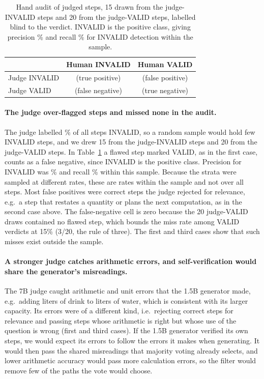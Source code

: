 \documentclass{article}
\begin{document}
\begin{table}[t]
  \centering
  \small
  \caption{Hand audit of \auditN{} judged steps, 15 drawn from the judge-INVALID steps and 20 from the judge-VALID steps, labelled blind to the verdict. INVALID is the positive class, giving precision \auditPrecision\% and recall \auditRecall\% for INVALID detection within the sample.}
  \label{tab:audit}
  \begin{tabular}{lcc}
    \toprule
     & Human INVALID & Human VALID \\
    \midrule
    Judge INVALID & \auditTP{} (true positive) & \auditFP{} (false positive) \\
    Judge VALID & \auditFN{} (false negative) & \auditTN{} (true negative) \\
    \bottomrule
  \end{tabular}
\end{table}

\paragraph{The judge over-flagged steps and missed none in the audit.} The judge labelled \stepsInvalidPct\% of all \judgeCalls{} steps INVALID, so a random sample would hold few INVALID steps, and we drew 15 from the judge-INVALID steps and 20 from the judge-VALID steps. In Table~\ref{tab:audit} a flawed step marked VALID, as in the first case, counts as a false negative, since INVALID is the positive class. Precision for INVALID was \auditPrecision\% and recall \auditRecall\% within this sample. Because the strata were sampled at different rates, these are rates within the sample and not over all steps. Most false positives were correct steps the judge rejected for relevance, e.g.\ a step that restates a quantity or plans the next computation, as in the second case above. The false-negative cell is zero because the 20 judge-VALID draws contained no flawed step, which bounds the miss rate among VALID verdicts at 15\% (3/20, the rule of three). The first and third cases show that such misses exist outside the sample.

\paragraph{A stronger judge catches arithmetic errors, and self-verification would share the generator's misreadings.} The 7B judge caught arithmetic and unit errors that the 1.5B generator made, e.g.\ adding liters of drink to liters of water, which is consistent with its larger capacity. Its errors were of a different kind, i.e.\ rejecting correct steps for relevance and passing steps whose arithmetic is right but whose use of the question is wrong (first and third cases). If the 1.5B generator verified its own steps, we would expect its errors to follow the errors it makes when generating. It would then pass the shared misreadings that majority voting already selects, and lower arithmetic accuracy would pass more calculation errors, so the filter would remove few of the paths the vote would choose.
\end{document}
